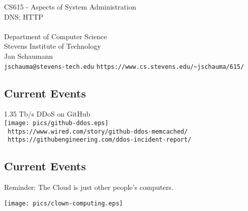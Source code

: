 \documentclass[xga]{xdvislides}
\begin{document}
\setfontphv

\lhead{\slidetitle}                               %
\cfoot{\relax}                               %
\rfoot{\Gray{\today}}

\newcommand{\smallish}{\fontsize{15}{20}\selectfont}

\vspace*{\fill}
\begin{center}
	\Hugesize
		CS615 - Aspects of System Administration\\ [1em]
		DNS; HTTP\\ [1em]
	\hspace*{5mm}\blueline\\ [1em]
	\Normalsize
		Department of Computer Science\\
		Stevens Institute of Technology\\
		Jan Schaumann\\
		\verb+jschauma@stevens-tech.edu+
		\verb+https://www.cs.stevens.edu/~jschauma/615/+
\end{center}
\vspace*{\fill}

\subsection{Current Events} \begin{center} 1.35 Tb/s
DDoS on GitHub \\ \vspace{.25in}
\texttt{[image: pics/github-ddos.eps]} \\
\vspace{.25in} {\tt
https://www.wired.com/story/github-ddos-memcached/} \\
{\tt
https://githubengineering.com/ddos-incident-report/}
\end{center}

\subsection{Current Events}

Reminder: The Cloud is just other people's computers.
\\
\begin{center}
\texttt{[image: pics/clown-computing.eps]} \\
\end{center}
\end{document}
